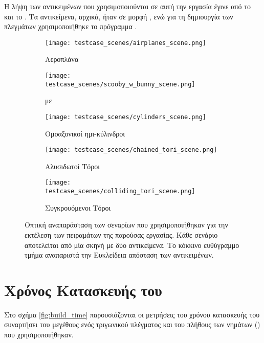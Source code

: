 Η λήψη των αντικειμένων που χρησιμοποιούνται σε αυτή την εργασία 
έγινε από το \cite{GrabCAD} και το 
\cite{3dcontentcentral}. 
Τα αντικείμενα, αρχικά, ήταν σε μορφή , ενώ για τη 
δημιουργία των πλεγμάτων χρησιμοποιήθηκε το πρόγραμμα 
.

\begin{figure}[H]
    \begin{subfigure}{0.49\textwidth}
        \texttt{[image: testcase\_scenes/airplanes\_scene.png]}
        \caption{Αεροπλάνα}
    \end{subfigure}
    \begin{subfigure}{0.49\textwidth}
        \texttt{[image: testcase\_scenes/scooby\_w\_bunny\_scene.png]}
        \caption{ με }
    \end{subfigure}
    \begin{subfigure}{0.49\textwidth}
        \texttt{[image: testcase\_scenes/cylinders\_scene.png]}
        \caption{Ομοαξονικοί ημι-κύλινδροι}
    \end{subfigure}
    \begin{subfigure}{0.49\textwidth}
        \texttt{[image: testcase\_scenes/chained\_tori\_scene.png]}
        \caption{Αλυσιδωτοί Τόροι}
    \end{subfigure}
    \centering
    \begin{subfigure}{0.49\textwidth}
        \texttt{[image: testcase\_scenes/colliding\_tori\_scene.png]}
        \caption{Συγκρουόμενοι Τόροι}
    \end{subfigure}
    \caption[Οπτική αναπαράσταση των σεναρίων των πειραμάτων]{
        Οπτική αναπαράσταση των σεναρίων που χρησιμοποιήθηκαν για την 
        εκτέλεση των πειραμάτων της παρούσας εργασίας.
        Κάθε σενάριο αποτελείται από μία σκηνή με δύο αντικείμενα.  
        Το κόκκινο ευθύγραμμο τμήμα αναπαριστά την Ευκλείδεια απόσταση 
        των αντικειμένων.
    }
    \label{fig:scenarios_photos}
\end{figure}

\section{Χρόνος Κατασκευής του }
Στο σχήμα \ref{fig:build_time} παρουσιάζονται οι μετρήσεις του 
χρόνου κατασκευής του  συναρτήσει του μεγέθους ενός 
τριγωνικού πλέγματος και του πλήθους των νημάτων ()
που χρησιμοποιήθηκαν.

